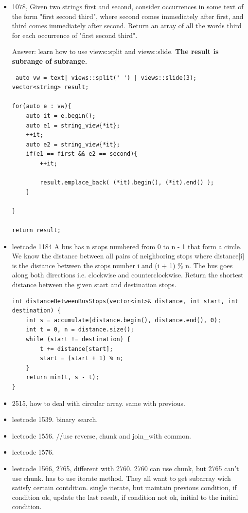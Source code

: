 \documentclass[a4paper,11pt,twoside]{book}
\begin{document}
\begin{itemize}
	\item 1078, Given two strings first and second, consider occurrences in some text of the form "first second third", where second comes immediately after first, and third comes immediately after second. Return an array of all the words third for each occurrence of "first second third".
	
	Answer: learn how to use views::split and views::slide. \textbf{The result is subrange of subrange.} 
\begin{lstlisting}
 auto vw = text| views::split(' ') | views::slide(3);
vector<string> result;

for(auto e : vw){
	auto it = e.begin();
	auto e1 = string_view{*it};
	++it;
	auto e2 = string_view{*it};
	if(e1 == first && e2 == second){
		++it;                
		
		result.emplace_back( (*it).begin(), (*it).end() );
	}
	
}

return result;
\end{lstlisting}
	
	\item leetcode 1184 A bus has n stops numbered from 0 to n - 1 that form a circle. We know the distance between all pairs of neighboring stops where distance[i] is the distance between the stops number i and (i + 1) \% n. The bus goes along both directions i.e. clockwise and counterclockwise. Return the shortest distance between the given start and destination stops.
	
\begin{lstlisting}
int distanceBetweenBusStops(vector<int>& distance, int start, int destination) {
	int s = accumulate(distance.begin(), distance.end(), 0);
	int t = 0, n = distance.size();
	while (start != destination) {
		t += distance[start];
		start = (start + 1) % n;
	}
	return min(t, s - t);
}	
\end{lstlisting}	
	\item 2515, how to deal with circular array. same with previous.
	

	\item leetcode 1539. binary search.
	
	\item leetcode 1556.  //use reverse, chunk and join\_with common.
	
	
	
	\item leetcode 1576.
	
	\item leetcode 1566, 2765, different with 2760. 2760 can use chunk, but 2765 can't use chunk. has to use iterate method. 
	They all want to get subarray wich satisfy certain contdition. single iterate, but maintain previous condition, if condition ok, update the last result, if condition not ok, initial to the initial condition.  
	

\end{itemize}
\end{document}
